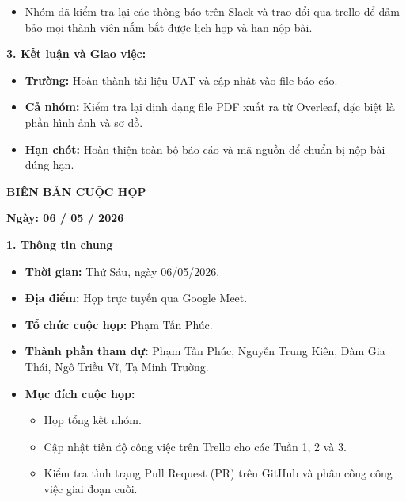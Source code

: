 \documentclass[12pt,a4paper]{article}
\begin{document}
\begin{itemize}
    \item Nhóm đã kiểm tra lại các thông báo trên Slack và trao đổi qua trello để đảm bảo mọi thành viên nắm bắt được lịch họp và hạn nộp bài.
\end{itemize}

\vspace{2pt}
\textbf{3. Kết luận và Giao việc:}
\begin{itemize}
    \item \textbf{Trường:} Hoàn thành tài liệu UAT và cập nhật vào file báo cáo.
    \item \textbf{Cả nhóm:} Kiểm tra lại định dạng file PDF xuất ra từ Overleaf, đặc biệt là phần hình ảnh và sơ đồ.
    \item \textbf{Hạn chót:} Hoàn thiện toàn bộ báo cáo và mã nguồn để chuẩn bị nộp bài đúng hạn.
\end{itemize}

\newpage

\begin{center}
    {\large\bfseries BIÊN BẢN CUỘC HỌP}
\end{center}
\begin{center}
    \textbf{Ngày: 06 / 05 / 2026}
\end{center}
\vspace{0.4em}

\textbf{1. Thông tin chung}
\begin{itemize}
    \item \textbf{Thời gian:} Thứ Sáu, ngày 06/05/2026.
    \item \textbf{Địa điểm:} Họp trực tuyến qua Google Meet.
    \item \textbf{Tổ chức cuộc họp:} Phạm Tấn Phúc.
    \item \textbf{Thành phần tham dự:} Phạm Tấn Phúc, Nguyễn Trung Kiên, Đàm Gia Thái, Ngô Triều Vĩ, Tạ Minh Trường.
    \item \textbf{Mục đích cuộc họp:}
    \begin{itemize}
        \item Họp tổng kết nhóm.
        \item Cập nhật tiến độ công việc trên Trello cho các Tuần 1, 2 và 3.
        \item Kiểm tra tình trạng Pull Request (PR) trên GitHub và phân công công việc giai đoạn cuối.
    \end{itemize}
\end{itemize}
\end{document}
